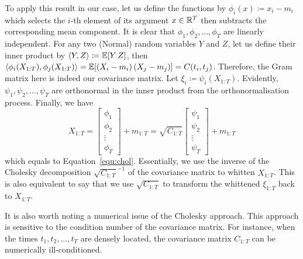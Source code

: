 \documentclass[]{article}
\begin{document}
To apply this result in our case, let us define the functions by $\phi_i(x) \coloneqq x_i - m_i$ which selects the $i$-th element of its argument $x\in\mathbb{R}^T$ then subtracts the corresponding mean component. It is clear that $\phi_1, \phi_2, \ldots, \phi_T$ are linearly independent. For any two (Normal) random variables $Y$ and $Z$, let us define their inner product by $\innerp{Y, Z} \coloneqq \expec{Y \, Z}$, then $\innerp{\phi_i(X_{1:T}), \phi_j(X_{1:T})} = \expec{(X_i - m_i) \, (X_j - m_j)} = C(t_i, t_j)$. Therefore, the Gram matrix here is indeed our covariance matrix. Let $\xi_i \coloneqq \psi_i(X_{1:T})$. Evidently, $\psi_1, \psi_2, \ldots, \psi_T$ are orthonormal in the inner product from the orthonormalisation process. Finally, we have
%
\begin{equation*}
	X_{1:T} = 
	\begin{bmatrix}
		\phi_1 \\
		\phi_2 \\
		\vdots \\
		\phi_T
	\end{bmatrix} + m_{1:T} =
	\sqrt{C_{1:T}}
	\begin{bmatrix}
		\psi_1 \\
		\psi_2 \\
		\vdots \\
		\psi_T
	\end{bmatrix} + m_{1:T}
\end{equation*}
%
which equals to Equation~\eqref{equ:chol}. Essentially, we use the inverse of the Cholesky decomposition $\sqrt{C_{1:T}}^{-1}$ of the covariance matrix to whitten $X_{1:T}$. This is also equivalent to say that we use $\sqrt{C_{1:T}}$ to transform the whittened $\xi_{1:T}$ back to $X_{1:T}$. 

It is also worth noting a numerical issue of the Cholesky approach. This approach is sensitive to the condition number of the covariance matrix. For instance, when the times $t_1, t_2, \ldots, t_T$ are densely located, the covariance matrix $C_{1:T}$ can be numerically ill-conditioned.
\end{document}
